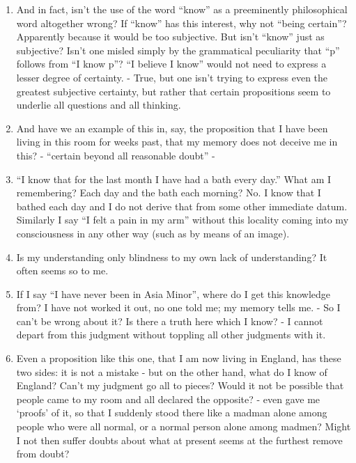 \documentclass{book}
\begin{document}
\begin{enumerate}
\item
And in fact, isn't the use of the word ``know'' as a preeminently philosophical
word altogether wrong? If ``know'' has this interest, why not ``being
certain''? Apparently because it would be too subjective. But isn't ``know''
just as subjective? Isn't one misled simply by the grammatical peculiarity that
``p'' follows from ``I know p''?  ``I believe I know'' would not need to
express a lesser degree of certainty. - True, but one isn't trying to express
even the greatest subjective certainty, but rather that certain propositions
seem to underlie all questions and all thinking.

\item
And have we an example of this in, say, the proposition that I have been living
in this room for weeks past, that my memory does not deceive me in this?  -
``certain beyond all reasonable doubt'' -

\item
``I know that for the last month I have had a bath every day.'' What am I
remembering? Each day and the bath each morning? No. I know that I bathed each
day and I do not derive that from some other immediate datum. Similarly I say
``I felt a pain in my arm'' without this locality coming into my consciousness
in any other way (such as by means of an image).

\item
Is my understanding only blindness to my own lack of understanding? It often
seems so to me.

\item
If I say ``I have never been in Asia Minor'', where do I get this knowledge
from? I have not worked it out, no one told me; my memory tells me. - So I
can't be wrong about it? Is there a truth here which I know? - I cannot depart
from this judgment without toppling all other judgments with it.

\item
Even a proposition like this one, that I am now living in England, has these
two sides: it is not a mistake - but on the other hand, what do I know of
England? Can't my judgment go all to pieces?  Would it not be possible that
people came to my room and all declared the opposite? - even gave me `proofs'
of it, so that I suddenly stood there like a madman alone among people who were
all normal, or a normal person alone among madmen? Might I not then suffer
doubts about what at present seems at the furthest remove from doubt?


\end{enumerate}
\end{document}
